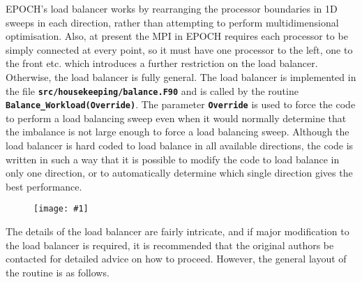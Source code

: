 \documentclass[12pt]{article}
\newcommand{\inlinecode}[1]{{\color{warwickred} \bf\texttt{#1}}}
\newcommand{\nEPOCH}{{\color{warwickdark}\fontfamily{phv}\selectfont EPOCH}}
\newcommand{\EPOCH}{{\nEPOCH} }
\newcommand{\image}[1]
  {{\begin{figure} \centering \texttt{[image: \#1]} \end{figure}}}
\begin{document}
EPOCH's load balancer works by rearranging the processor boundaries in 1D
sweeps in each direction, rather than attempting to perform multidimensional
optimisation. Also, at present the MPI in \EPOCH requires each processor to be
simply connected at every point, so it must have one processor to the left, one
to the front etc. which introduces a further restriction on the load
balancer. Otherwise, the load balancer is fully general. The load balancer is
implemented in the file \inlinecode{src/housekeeping/balance.F90} and is called
by the routine \inlinecode{Balance\_Workload(Override)}. The parameter
\inlinecode{Override} is used to force the code to perform a load balancing
sweep even when it would normally determine that the imbalance is not large
enough to force a load balancing sweep. Although the load balancer is hard
coded to load balance in all available directions, the code is written in such
a way that it is possible to modify the code to load balance in only one
direction, or to automatically determine which single direction gives the best
performance.

\image{./images/sweep.eps}

The details of the load balancer are fairly intricate, and if major
modification to the load balancer is required, it is recommended that the
original authors be contacted for detailed advice on how to proceed. However,
the general layout of the routine is as follows.
\end{document}
